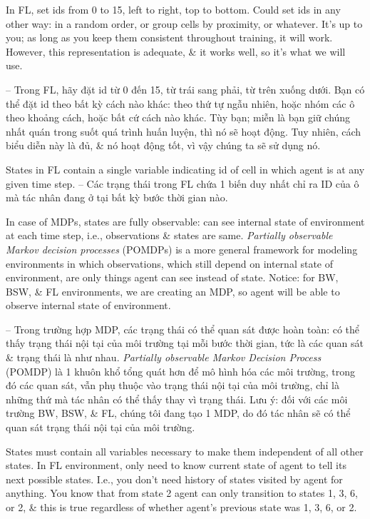 \documentclass{article}
\begin{document}
\begin{itemize}
\begin{itemize}
        In FL, set ids from 0 to 15, left to right, top to bottom. Could set ids in any other way: in a random order, or group cells by proximity, or whatever. It's up to you; as long as you keep them consistent throughout training, it will work. However, this representation is adequate, \& it works well, so it's what we will use.

        -- Trong FL, hãy đặt id từ 0 đến 15, từ trái sang phải, từ trên xuống dưới. Bạn có thể đặt id theo bất kỳ cách nào khác: theo thứ tự ngẫu nhiên, hoặc nhóm các ô theo khoảng cách, hoặc bất cứ cách nào khác. Tùy bạn; miễn là bạn giữ chúng nhất quán trong suốt quá trình huấn luyện, thì nó sẽ hoạt động. Tuy nhiên, cách biểu diễn này là đủ, \& nó hoạt động tốt, vì vậy chúng ta sẽ sử dụng nó.

        {\sf States in FL contain a single variable indicating id of cell in which agent is at any given time step.} -- Các trạng thái trong FL chứa 1 biến duy nhất chỉ ra ID của ô mà tác nhân đang ở tại bất kỳ bước thời gian nào.

        In case of MDPs, states are fully observable: can see internal state of environment at each time step, i.e., observations \& states are same. {\it Partially observable Markov decision processes} (POMDPs) is a more general framework for modeling environments in which observations, which still depend on internal state of environment, are only things agent can see instead of state. Notice: for BW, BSW, \& FL environments, we are creating an MDP, so agent will be able to observe internal state of environment.

        -- Trong trường hợp MDP, các trạng thái có thể quan sát được hoàn toàn: có thể thấy trạng thái nội tại của môi trường tại mỗi bước thời gian, tức là các quan sát \& trạng thái là như nhau. {\it Partially observable Markov Decision Process} (POMDP) là 1 khuôn khổ tổng quát hơn để mô hình hóa các môi trường, trong đó các quan sát, vẫn phụ thuộc vào trạng thái nội tại của môi trường, chỉ là những thứ mà tác nhân có thể thấy thay vì trạng thái. Lưu ý: đối với các môi trường BW, BSW, \& FL, chúng tôi đang tạo 1 MDP, do đó tác nhân sẽ có thể quan sát trạng thái nội tại của môi trường.

        States must contain all variables necessary to make them independent of all other states. In FL environment, only need to know current state of agent to tell its next possible states. I.e., you don't need history of states visited by agent for anything. You know that from state 2 agent can only transition to states 1, 3, 6, or 2, \& this is true regardless of whether agent's previous state was 1, 3, 6, or 2.


\end{itemize}
\end{itemize}
\end{document}
